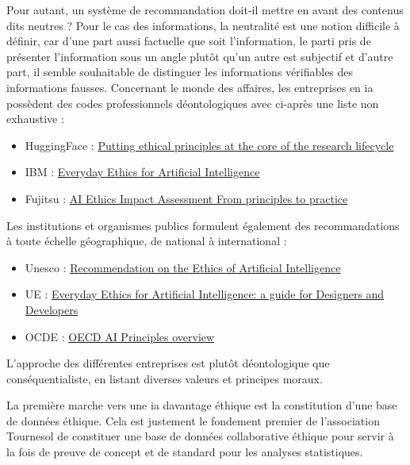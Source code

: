 Pour autant, un système de recommandation doit-il mettre en avant des contenus dits neutres ? Pour le cas des informations, la neutralité est une notion difficile à définir, car d'une part aussi factuelle que soit l'information, le parti pris de présenter l'information sous un angle plutôt qu'un autre est subjectif et d'autre part, il semble souhaitable de distinguer les informations vérifiables des informations fausses.
Concernant le monde des affaires, les entreprises en \gls{ia} possèdent des codes professionnels déontologiques avec ci-après une liste non exhaustive  : 

\begin{itemize}
    \item HuggingFace : \href{https://huggingface.co/blog/ethical-charter-multimodal}{Putting ethical principles at the core of the research lifecycle}
    \item IBM : \href{https://www.ibm.com/watson/assets/duo/pdf/everydayethics.pdf}{Everyday
Ethics
for Artificial
Intelligence}
    \item Fujitsu : \href{https://www.fujitsu.com/global/about/research/technology/aiethics/}{AI Ethics Impact
Assessment
From principles
to practice}
\end{itemize}

Les institutions et organismes publics formulent également des recommandations à toute échelle géographique, de national à international : 

\begin{itemize}
    \item Unesco : \href{https://unesdoc.unesco.org/ark:/48223/pf0000381137}{Recommendation on the Ethics of Artificial Intelligence
}
    \item UE : \href{https://futurium.ec.europa.eu/en/european-ai-alliance/blog/everyday-ethics-artificial-intelligence-guide-designers-and-developers}{Everyday Ethics for Artificial Intelligence: a guide for Designers and Developers}
    \item OCDE : \href{https://oecd.ai/en/ai-principles}{OECD AI Principles overview}
\end{itemize}

L'approche des différentes entreprises est plutôt déontologique que conséquentialiste, en listant diverses valeurs et principes moraux.


La première marche vers une \gls{ia} davantage éthique est la constitution d'une base de données éthique. Cela est justement le fondement premier de l'association Tournesol de constituer une base de données collaborative éthique pour servir à la fois de preuve de concept et de standard pour les analyses statistiques.